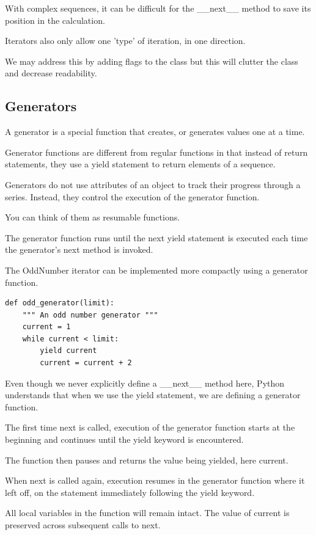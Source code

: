 \documentclass{article}
\begin{document}
With complex sequences, it can be difficult for the {\_}{\_}next{\_}{\_} method to save its position in the calculation.

Iterators also only allow one 'type' of iteration,  in one direction.

We may address this by adding flags to the class but this will clutter the class and decrease readability. 

\subsection{Generators}
A generator is a special function that creates, or generates values one at a time. 

Generator functions are different from regular functions in that instead of return statements, they use a yield statement to return elements of a sequence.

Generators do not use attributes of an object to track their progress through a series. Instead, they control the execution of the generator function.

You can think of them as resumable functions. 

The generator function runs until the next yield statement is executed each time the generator's next method is invoked.

The OddNumber iterator can be implemented  more compactly using a generator function.

\begin{lstlisting}
def odd_generator(limit):
    """ An odd number generator """
    current = 1
    while current < limit:
        yield current
        current = current + 2
\end{lstlisting}

Even though we never explicitly define a {\_}{\_}next{\_}{\_} method here, Python understands that when we use the yield statement, we are defining a generator function. 

The first time next is called, execution of the generator function starts at the beginning and continues until the yield keyword is encountered. 

The function then pauses and returns the value being yielded, here current.

When next is called again, execution resumes in the generator function where it left off, on the statement immediately following the yield keyword.

All local variables in the function will remain intact. The value of current is  preserved across subsequent calls to next. 
\end{document}
